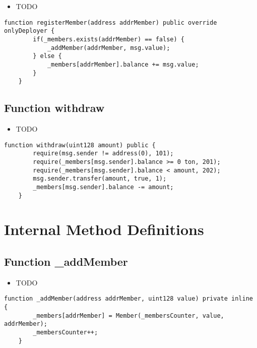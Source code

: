 \begin{itemize}
\item TODO
\end{itemize}

\begin{lstlisting}[firstnumber=24]
    function registerMember(address addrMember) public override onlyDeployer {
        if(_members.exists(addrMember) == false) {
            _addMember(addrMember, msg.value);
        } else {
            _members[addrMember].balance += msg.value;
        }
    }
\end{lstlisting}

\subsection{Function withdraw}

\begin{itemize}
\item TODO
\end{itemize}

\begin{lstlisting}[firstnumber=37]
    function withdraw(uint128 amount) public {
        require(msg.sender != address(0), 101);
        require(_members[msg.sender].balance >= 0 ton, 201);
        require(_members[msg.sender].balance < amount, 202);
        msg.sender.transfer(amount, true, 1);
        _members[msg.sender].balance -= amount;
    }
\end{lstlisting}

\section{Internal Method Definitions}


\subsection{Function \_{}addMember}

\begin{itemize}
\item TODO
\end{itemize}

\begin{lstlisting}[firstnumber=32]
    function _addMember(address addrMember, uint128 value) private inline {
        _members[addrMember] = Member(_membersCounter, value, addrMember);
        _membersCounter++;
    }
\end{lstlisting}
